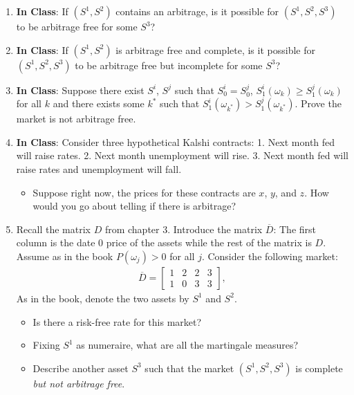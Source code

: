 \documentclass[12pt]{article}
\renewcommand{\o}{\omega}
\newcommand{\ol}{\overline}
\begin{document}
\begin{enumerate}
\begin{align*}
\right],
\end{align*}
As in the book, denote the two assets by $S^1$ and $S^2$.
  \begin{itemize}
    \item Is there a risk-free rate?
    \item Is the market arbitrage free?
  \end{itemize}
  \item[] \textbf{In Class}: If $(S^1, S^2)$ contains an arbitrage, is it possible for $(S^1, S^2, S^3)$ to be arbitrage free for some $S^3$?
  \item[] \textbf{In Class}: If $(S^1, S^2)$ is arbitrage free and complete, is it possible for $(S^1, S^2, S^3)$ to be arbitrage free but incomplete for some $S^3$?
  \item[] \textbf{In Class}: Suppose there exist $S^i$, $S^j$ such that $S^i_0 = S^j_0$, $S^i_1(\o_k) \geq S^j_1(\o_k)$ for all $k$ and there exists some $k^*$ such that $S^i_1(\o_{k^*}) > S^j_1(\o_{k^*})$. Prove the market is not arbitrage free.
  \item[] \textbf{In Class}: Consider three hypothetical Kalshi contracts: 1. Next month fed will raise rates. 2. Next month unemployment will rise. 3. Next month fed will raise rates and unemployment will fall.
  \begin{itemize}
    \item Suppose right now, the prices for these contracts are $x$, $y$, and $z$. How would you go about telling if there is arbitrage?
  \end{itemize}
  \item Recall the matrix $D$ from chapter 3. Introduce the matrix $\ol{D}$: The first column is the date 0 price of the assets while the rest of the matrix is $D$. Assume as in the book $P(\o_j) > 0$ for all $j$. Consider the following market:
\begin{align*}
\ol{D}=
\left[\begin{array}{llll}
1 & 2 & 2 & 3\\
1 & 0 & 3 & 3
\end{array}
\right],
\end{align*}
As in the book, denote the two assets by $S^1$ and $S^2$. 
  \begin{itemize}
    \item Is there a risk-free rate for this market?
    \item Fixing $S^1$ as numeraire, what are all the martingale measures?
    \item Describe another asset $S^3$ such that the market $(S^1, S^2, S^3)$ is complete \emph{but not arbitrage free}.

\end{itemize}
\end{enumerate}
\end{document}
